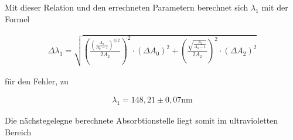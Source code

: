 Mit dieser Relation und den errechneten Parametern berechnet sich $\lambda_1$ mit der Formel

\begin{align*}
  \Delta \lambda_1 = \sqrt{\left(\frac{\left(\frac{A_2}{A_0-1}\right)^{3/2}}{2A_2}\right)^2 \cdot \left(\Delta A_0\right)^2 + \left(\frac{\sqrt{\frac{A_2}{A_0-1}}}{2 A_2}\right)^2 \cdot \left(\Delta A_2\right)^2}
\end{align*}

für den Fehler, zu

\begin{align*}
  \lambda_1 = 148,21 \pm 0,07 \text{nm}
\end{align*}

Die nächstegelegne berechnete Absorbtionstelle liegt somit im ultravioletten Bereich